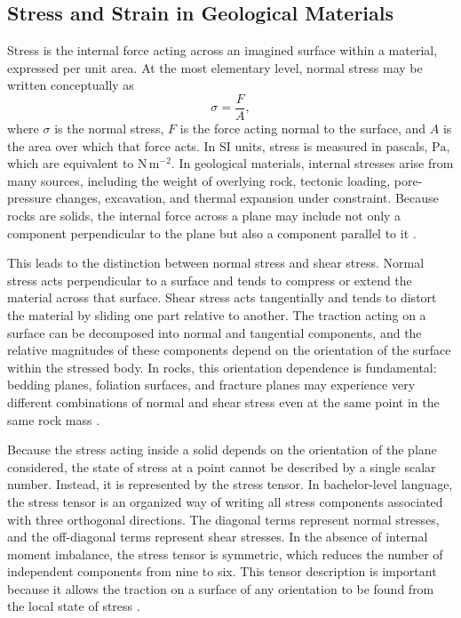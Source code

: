 \subsection{Stress and Strain in Geological Materials}

Stress is the internal force acting across an imagined surface within a material, expressed per unit area. At the most elementary level, normal stress may be written conceptually as
\begin{equation}
\sigma = \frac{F}{A},
\end{equation}
where $\sigma$ is the normal stress, $F$ is the force acting normal to the surface, and $A$ is the area over which that force acts. In SI units, stress is measured in pascals, $\mathrm{Pa}$, which are equivalent to $\mathrm{N\,m^{-2}}$. In geological materials, internal stresses arise from many sources, including the weight of overlying rock, tectonic loading, pore-pressure changes, excavation, and thermal expansion under constraint. Because rocks are solids, the internal force across a plane may include not only a component perpendicular to the plane but also a component parallel to it \cite{jaeger2007,cornet2007}.

This leads to the distinction between normal stress and shear stress. Normal stress acts perpendicular to a surface and tends to compress or extend the material across that surface. Shear stress acts tangentially and tends to distort the material by sliding one part relative to another. The traction acting on a surface can be decomposed into normal and tangential components, and the relative magnitudes of these components depend on the orientation of the surface within the stressed body. In rocks, this orientation dependence is fundamental: bedding planes, foliation surfaces, and fracture planes may experience very different combinations of normal and shear stress even at the same point in the same rock mass \cite{jaeger2007,cornet2007}.

Because the stress acting inside a solid depends on the orientation of the plane considered, the state of stress at a point cannot be described by a single scalar number. Instead, it is represented by the stress tensor. In bachelor-level language, the stress tensor is an organized way of writing all stress components associated with three orthogonal directions. The diagonal terms represent normal stresses, and the off-diagonal terms represent shear stresses. In the absence of internal moment imbalance, the stress tensor is symmetric, which reduces the number of independent components from nine to six. This tensor description is important because it allows the traction on a surface of any orientation to be found from the local state of stress \cite{aki2002,cornet2007,jaeger2007}.

